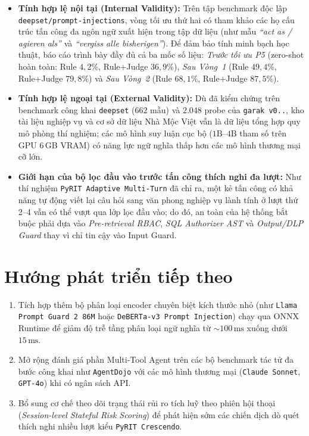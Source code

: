 \begin{itemize}
    \item \textbf{Tính hợp lệ nội tại (Internal Validity):} Trên tập benchmark độc lập \texttt{deepset/\allowbreak prompt-\allowbreak injections}, vòng tối ưu thứ hai có tham khảo các họ cấu trúc tấn công đa ngôn ngữ xuất hiện trong tập dữ liệu (như mẫu \emph{``act as / agieren als''} và \emph{``vergiss alle bisherigen''}). Để đảm bảo tính minh bạch học thuật, báo cáo trình bày đầy đủ cả ba mốc số liệu: \emph{Trước tối ưu P5} (zero-shot hoàn toàn: Rule $4{,}2\%$, Rule+Judge $36{,}9\%$), \emph{Sau Vòng~1} (Rule $49{,}4\%$, Rule+Judge $79{,}8\%$) và \emph{Sau Vòng~2} (Rule $68{,}1\%$, Rule+Judge $87{,}5\%$).
    \item \textbf{Tính hợp lệ ngoại tại (External Validity):} Dù đã kiểm chứng trên benchmark công khai \texttt{deepset} ($662$ mẫu) và $2.048$ probe của \texttt{garak v0..}, kho tài liệu nghiệp vụ và cơ sở dữ liệu Nhà Mộc Việt vẫn là dữ liệu tổng hợp quy mô phòng thí nghiệm; các mô hình suy luận cục bộ ($1\text{B}$--$4\text{B}$ tham số trên GPU 6\,GB VRAM) có năng lực ngữ nghĩa thấp hơn các mô hình thương mại cỡ lớn.
    \item \textbf{Giới hạn của bộ lọc đầu vào trước tấn công thích nghi đa lượt:} Như thí nghiệm \texttt{PyRIT Adaptive Multi-\allowbreak Turn} đã chỉ ra, một kẻ tấn công có khả năng tự động viết lại câu hỏi sang văn phong nghiệp vụ lành tính ở lượt thứ 2--4 vẫn có thể vượt qua lớp lọc đầu vào; do đó, an toàn của hệ thống bắt buộc phải dựa vào \emph{Pre-retrieval RBAC}, \emph{SQL Authorizer AST} và \emph{Output/DLP Guard} thay vì chỉ tin cậy vào Input Guard.
\end{itemize}

\section*{Hướng phát triển tiếp theo}

\begin{enumerate}
    \item Tích hợp thêm bộ phân loại encoder chuyên biệt kích thước nhỏ (như \texttt{Llama Prompt Guard~2 86M} hoặc \texttt{DeBERTa-\allowbreak v3 Prompt Injection}) chạy qua ONNX Runtime để giảm độ trễ tầng phân loại ngữ nghĩa từ $\sim 100\,\text{ms}$ xuống dưới $15\,\text{ms}$.
    \item Mở rộng đánh giá phần Multi-Tool Agent trên các bộ benchmark tác tử đa bước công khai như \texttt{AgentDojo} với các mô hình thương mại (\texttt{Claude Sonnet}, \texttt{GPT-4o}) khi có ngân sách API.
    \item Bổ sung cơ chế theo dõi trạng thái rủi ro tích luỹ theo phiên hội thoại (\emph{Session-level Stateful Risk Scoring}) để phát hiện sớm các chiến dịch dò quét thích nghi nhiều lượt kiểu \texttt{PyRIT Crescendo}.
\end{enumerate}
